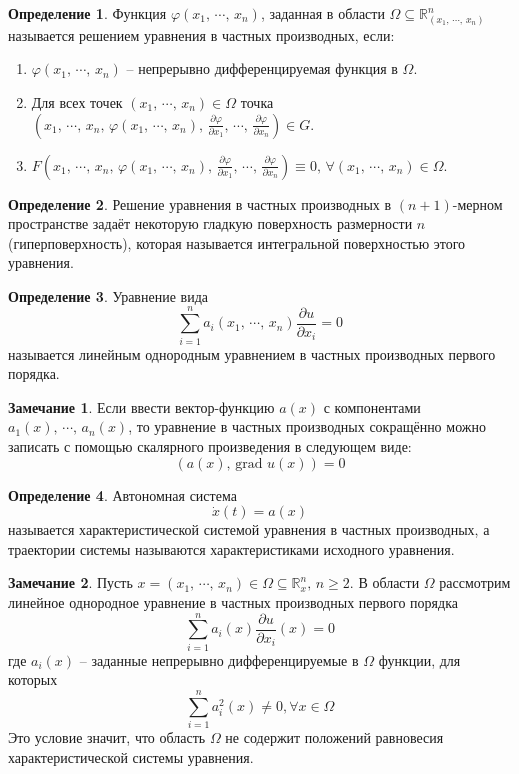 \documentclass[a4paper,12pt]{article}
\renewcommand{\phi}{\ensuremath{\varphi}}
\renewcommand{\geq}{\ensuremath{\geqslant}}
\theoremstyle{plain}
\theoremstyle{definition}
\newtheorem{definition}{Определение}[section]
\newtheorem*{note}{Замечание}
\theoremstyle{remark}
\begin{document}
\begin{definition}
	Функция $\phi(x_1,\,\cdots,\,x_n)$, заданная  в области $\Omega \subseteq \mathbb{R}^n_{(x_1,\,\cdots,\,x_n)}$ называется решением уравнения в частных производных, если:
	\begin{enumerate}
		\item $\phi(x_1,\,\cdots,\,x_n)$ -- непрерывно дифференцируемая функция в $\Omega$.
		\item Для всех точек $(x_1,\,\cdots,\,x_n) \in \Omega$ точка $(x_1,\,\cdots,\,x_n,\, \phi(x_1,\,\cdots,\,x_n),\, \frac{\partial \phi}{\partial x_1},\,\cdots,\,\frac{\partial \phi}{\partial x_n}) \in G$.
		\item $F(x_1,\,\cdots,\,x_n,\, \phi(x_1,\,\cdots,\,x_n),\, \frac{\partial \phi}{\partial x_1},\,\cdots,\,\frac{\partial \phi}{\partial x_n}) \equiv 0,\, \forall (x_1,\,\cdots,\,x_n) \in \Omega$.
	\end{enumerate}
\end{definition}

\begin{definition}
	Решение уравнения в частных производных в $(n + 1)$-мерном пространстве задаёт некоторую гладкую поверхность размерности $n$ (гиперповерхность), которая называется интегральной поверхностью этого уравнения.
\end{definition}

\begin{definition}
	Уравнение вида
	\[\sum_{i = 1}^na_i(x_1,\,\cdots,\,x_n)\frac{\partial u}{\partial x_i} = 0\]
	называется линейным однородным уравнением в частных производных первого порядка.
\end{definition}

\begin{note}
	Если ввести вектор-функцию $a(x)$ с компонентами $a_1(x),\,\cdots,\,a_n(x)$, то уравнение в частных производных сокращённо можно записать с помощью скалярного произведения в следующем виде:
	\[(a(x),\, \text{grad }u(x)) = 0\]
\end{note}

\begin{definition}
	Автономная система
	\[\dot{x}(t) = a(x)\]
	называется характеристической системой уравнения в частных производных, а траектории системы называются характеристиками исходного уравнения.
\end{definition}

\begin{note}
	Пусть $x = (x_1,\,\cdots,\,x_n) \in \Omega \subseteq \mathbb{R}^n_x,\, n \geq 2$. В области $\Omega$ рассмотрим линейное однородное уравнение в частных производных первого порядка
	\[\sum_{i = 1}^n a_i(x)\frac{\partial u}{\partial x_i}(x) = 0\]
	где $a_i(x)$ -- заданные непрерывно дифференцируемые в $\Omega$ функции, для которых
	\[\sum_{i = 1}^n a_i^2(x) \neq 0, \forall x \in \Omega\]
	Это условие значит, что область $\Omega$ не содержит положений равновесия характеристической системы уравнения.
\end{note}
\end{document}
